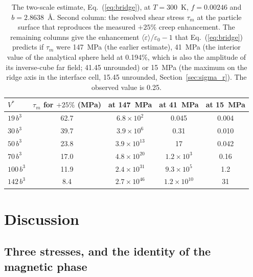 \begin{table}
\centering
\caption{The two-scale estimate, Eq.~(\ref{eq:bridge}), at $T=300$~K,
$f=0.00246$ and $b=2.8638$~\AA{}. Second column: the resolved
shear stress $\tau_m$ at the particle surface that reproduces the measured
$+25\%$ creep enhancement. The remaining columns give the enhancement
$\langle\dot\varepsilon\rangle/\dot\varepsilon_0-1$ that
Eq.~(\ref{eq:bridge}) predicts if $\tau_m$ were 147~MPa (the earlier
estimate), 41~MPa (the interior value of the analytical sphere held at 0.194\%, which
is also the amplitude of its inverse-cube far field; 41.45 unrounded) or 15~MPa (the maximum on the ridge axis in the interface
cell, 15.45 unrounded, Section~\ref{sec:sigma_r}). The observed value is 0.25.}
\label{tab:bridge}
\small
\begin{tabular}{lcccc}
\hline
$V^{*}$ & $\tau_m$ for $+25\%$ (MPa) & at 147~MPa & at 41~MPa & at 15~MPa \\
\hline
$19\,b^{3}$  & 62.7 & $6.8\times10^{2}$  & 0.045 & 0.004 \\
$30\,b^{3}$  & 39.7 & $3.9\times10^{6}$  & 0.31 & 0.010 \\
$50\,b^{3}$  & 23.8 & $3.9\times10^{13}$ & 17 & 0.042 \\
$70\,b^{3}$  & 17.0 & $4.8\times10^{20}$ & $1.2\times10^{3}$ & 0.16 \\
$100\,b^{3}$ & 11.9 & $2.4\times10^{31}$ & $9.3\times10^{5}$ & 1.2 \\
$142\,b^{3}$ & 8.4  & $2.7\times10^{46}$ & $1.2\times10^{10}$ & 31 \\
\hline
\end{tabular}
\end{table}

\section{Discussion}
\label{sec:discussion}

\subsection{Three stresses, and the identity of the magnetic phase}
\label{sec:phase}

